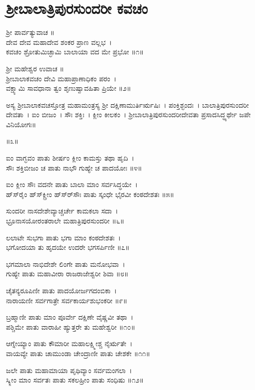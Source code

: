 \section{ಶ್ರೀಬಾಲಾತ್ರಿಪುರಸುಂದರೀ ಕವಚಂ}
ಶ್ರೀ ಪಾರ್ವತ್ಯುವಾಚ ॥\\
ದೇವ ದೇವ ಮಹಾದೇವ ಶಂಕರ ಪ್ರಾಣ ವಲ್ಲಭ~।\\
ಕವಚಂ ಶ್ರೋತುಮಿಚ್ಛಾಮಿ ಬಾಲಾಯಾ ವದ ಮೇ ಪ್ರಭೋ ॥೧॥

ಶ್ರೀ ಮಹೇಶ್ವರ ಉವಾಚ ॥\\
ಶ್ರೀಬಾಲಾಕವಚಂ ದೇವಿ ಮಹಾಪ್ರಾಣಾಧಿಕಂ ಪರಂ~।\\
ವಕ್ಷ್ಯಾಮಿ ಸಾವಧಾನಾ ತ್ವಂ ಶೃಣುಷ್ವಾವಹಿತಾ ಪ್ರಿಯೇ ॥೨॥

ಅಸ್ಯ ಶ್ರೀಬಾಲಾಕವಚಸ್ತೋತ್ರ ಮಹಾಮಂತ್ರಸ್ಯ ಶ್ರೀ ದಕ್ಷಿಣಾಮುರ್ತಿರ್ಋಷಿಃ~। ಪಂಕ್ತಿಶ್ಛಂದಃ~। ಬಾಲಾತ್ರಿಪುರಸುಂದರೀ ದೇವತಾ~। ಐಂ ಬೀಜಂ~। ಸೌಃ ಶಕ್ತಿಃ~। ಕ್ಲೀಂ ಕೀಲಕಂ~। ಶ್ರೀಬಾಲಾತ್ರಿಪುರಸುಂದರೀದೇವತಾ ಪ್ರಸಾದಸಿದ್ಧ್ಯರ್ಥೇ ಜಪೇ ವಿನಿಯೋಗಃ॥

॥೩॥

ಐಂ ವಾಗ್ಭವಂ ಪಾತು ಶೀರ್ಷಂ ಕ್ಲೀಂ ಕಾಮಸ್ತು ತಥಾ ಹೃದಿ~।\\
ಸೌಃ ಶಕ್ತಿಬೀಜಂ ಚ ಪಾತು ನಾಭೌ ಗುಹ್ಯೇ ಚ ಪಾದಯೋಃ ॥೪॥

ಐಂ ಕ್ಲೀಂ ಸೌಃ ವದನೇ ಪಾತು ಬಾಲಾ ಮಾಂ ಸರ್ವಸಿದ್ಧಯೇ~।\\
ಹ್‌ಸ್‌ರೈಂ ಹ್‌ಸ್‌ಕ್ಲ್ರೀಂ ಹ್‌ಸ್‌ರ್‌ಸೌಃ ಪಾತು ಸ್ಕಂಧೇ ಭೈರವೀ ಕಂಠದೇಶತಃ ॥೫॥

ಸುಂದರೀ ನಾಸದೇಶೇವ್ಯಾಚ್ಚರ್ಚೇ ಕಾಮಕಲಾ ಸದಾ~।\\
ಭ್ರೂನಾಸಯೋರಂತರಾಲೇ ಮಹಾತ್ರಿಪುರಸುಂದರೀ ॥೬॥

ಲಲಾಟೇ ಸುಭಗಾ ಪಾತು ಭಗಾ ಮಾಂ ಕಂಠದೇಶತಃ~।\\
ಭಗೋದಯಾ ತು ಹೃದಯೇ ಉದರೇ ಭಗಸರ್ಪಿಣೀ ॥೭॥

ಭಗಮಾಲಾ ನಾಭಿದೇಶೇ ಲಿಂಗೇ ಪಾತು ಮನೋಭವಾ~।\\
ಗುಹ್ಯೇ ಪಾತು ಮಹಾವೀರಾ ರಾಜರಾಜೇಶ್ವರೀ ಶಿವಾ ॥೮॥

ಚೈತನ್ಯರೂಪಿಣೀ ಪಾತು ಪಾದಯೋರ್ಜಗದಂಬಿಕಾ~।\\
ನಾರಾಯಣೀ ಸರ್ವಗಾತ್ರೇ ಸರ್ವಕಾರ್ಯಶುಭಂಕರೀ ॥೯॥

ಬ್ರಹ್ಮಾಣೀ ಪಾತು ಮಾಂ ಪೂರ್ವೇ ದಕ್ಷಿಣೇ ವೈಷ್ಣವೀ ತಥಾ~।\\
ಪಶ್ಚಿಮೇ ಪಾತು ವಾರಾಹೀ ಹ್ಯುತ್ತರೇ ತು ಮಹೇಶ್ವರೀ ॥೧೦॥

ಆಗ್ನೇಯ್ಯಾಂ ಪಾತು ಕೌಮಾರೀ ಮಹಾಲಕ್ಷ್ಮೀಶ್ಚ ನೈರ್ಋತೇ~।\\
ವಾಯವ್ಯೇ ಪಾತು ಚಾಮುಂಡಾ ಚೇಂದ್ರಾಣೀ ಪಾತು ಚೇಶಕೇ ॥೧೧॥

ಜಲೇ ಪಾತು ಮಹಾಮಾಯಾ ಪೃಥಿವ್ಯಾಂ ಸರ್ವಮಂಗಲಾ~।\\
ಸ್ಕ್ಲೀಂ ಮಾಂ ಸರ್ವತಃ ಪಾತು ಸಕಲಹ್ರೀಂ ಪಾತು ಸಂಧಿಷು ॥೧೨॥

